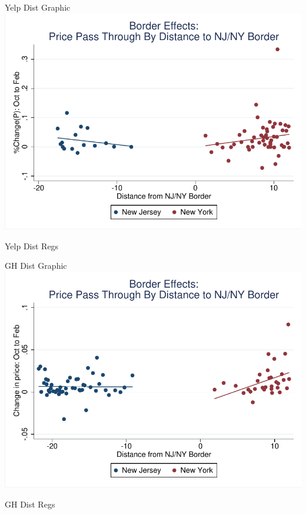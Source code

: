 \documentclass[xcolor=table]{beamer}
\newcommand\Wider[2][4em]{%
\makebox[\linewidth][c]{%
  \begin{minipage}{\dimexpr\textwidth+#1\relax}
  \raggedright#2
  \end{minipage}%
  }%
}
\begin{document}
\begin{spacing}{1.2}
\begin{frame}{Yelp Dist Graphic}
\centering
\tiny
\includegraphics[scale=.75]{distance_yelp.pdf}
\end{frame}

\begin{frame}{Yelp Dist Regs}
\Wider{
\centering
\tiny

}
\end{frame}

\begin{frame}{GH Dist Graphic}
\centering
\tiny
\includegraphics[scale=.75]{gh_dist.pdf}
\end{frame}


\begin{frame}{GH Dist Regs}
\Wider{
\centering
\tiny

}
\end{frame}


\end{spacing}
\end{document}
